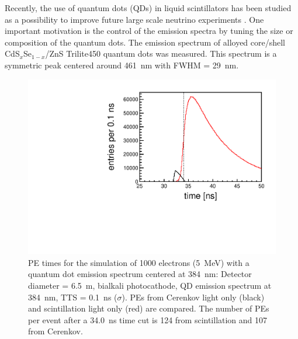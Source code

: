 \documentclass[aps,prc,twocolumn,groupedaddress,showpacs,amsmath,amssymb,floatfix,superscriptaddress]{revtex4}
\begin{document}
Recently, the use of quantum dots (QDs) in liquid scintillators has been studied as a possibility to improve future large scale neutrino experiments \cite{tbd}. One important motivation is the control of the emission spectra by tuning the size or composition of the quantum dots. The emission spectrum of alloyed core/shell CdS$_x$Se$_{1-x}$/ZnS Trilite450 \cite{tbd} quantum dots was measured. This spectrum is a symmetric peak centered around 461~nm with FWHM = 29~nm. 

\begin{figure}
        \begin{center}
        \includegraphics[scale=0.40]{graphs/6p5Meter_5MeVElectrons_Bialkali_QD384nmScintSpec_TIME.pdf}
        \caption[]{PE times for the simulation of 1000 electrons (5~MeV) with a quantum dot emission spectrum centered at 384~nm: Detector diameter = 6.5~m, bialkali photocathode, QD emission spectrum at 384~nm, TTS = 0.1~ns ($\sigma$). PEs from Cerenkov light only (black) and scintillation light only (red) are compared. The number of PEs per event after a 34.0~ns time cut is 124 from scintillation and 107 from Cerenkov. \label{6p5Meter_5MeVElectrons_Bialkali_QD384nmScintSpec_TIME}}
        \end{center}
\end{figure}  
\end{document}
